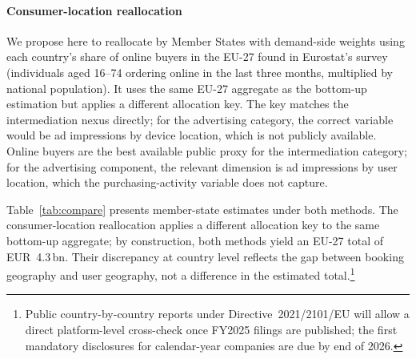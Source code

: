 \documentclass[../../main]{subfiles}
\begin{document}
\paragraph{Consumer-location reallocation}
We propose here to reallocate by Member States with demand-side weights using each country's share of online buyers in the EU-27 found in Eurostat's survey~\citep{eurostat_isoc_ec_ib20} (individuals aged 16--74 ordering online in the last three months, multiplied by national population).
It uses the same EU-27 aggregate as the bottom-up estimation but applies a different allocation key.
The key matches the intermediation nexus directly; for the advertising category, the correct variable would be ad impressions by device location, which is not publicly available.
Online buyers are the best available public proxy for the intermediation category; for the advertising component, the relevant dimension is ad impressions by user location, which the purchasing-activity variable does not capture.

Table~\ref{tab:compare} presents member-state estimates under both methods.
The consumer-location reallocation applies a different allocation key to the same bottom-up aggregate; by construction, both methods yield an EU-27 total of EUR~4.3\,bn. Their discrepancy at country level reflects the gap between booking geography and user geography, not a difference in the estimated total.\footnote{Public country-by-country reports under Directive~2021/2101/EU will allow a direct platform-level cross-check once FY2025 filings are published; the first mandatory disclosures for calendar-year companies are due by end of 2026.}
\end{document}
